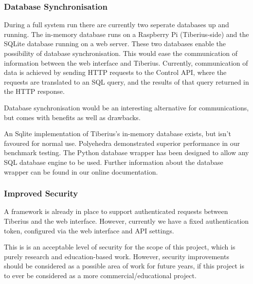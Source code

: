 \subsubsection{Database Synchronisation}
During a full system run there are currently two seperate databases up and
running. The in-memory database runs on a Raspberry Pi (Tiberius-side) and the
SQLite database running on a web server. These two databases enable the
possibility of database synchronisation. This would ease the communication of
information between the web interface and Tiberius. Currently, communication of
data is achieved by sending HTTP requests to the Control API, where the
requests are translated to an SQL query, and the results of that query returned
in the HTTP response.

Database synchronisation would be an interesting alternative for communications,
but comes with benefits as well as drawbacks.

An Sqlite implementation of Tiberius's in-memory database exists, but isn't
favoured for normal use. Polyehedra demonstrated superior performance in
our benchmark testing. The Python database wrapper has been designed to allow
any SQL database engine to be used. Further information about the database
wrapper can be found in our online documentation.


\subsubsection{Improved Security}
A framework is already in place to support authenticated requests between
Tiberius and the web interface. However, currently we have a fixed
authentication token, configured via the web interface and API settings.

This is is an acceptable level of security for the scope of this project, which
is purely research and education-based work. However, security improvements
should be considered as a possible area of work for future years, if this
project is to ever be considered as a more commercial/educational project.

